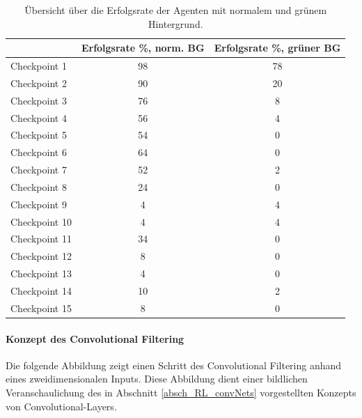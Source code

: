 \begin{center}
 \begin{table}[htb!]
 \begin{center}
  \begin{tabular}{ l c c  }
    \hline
	       				& Erfolgsrate \%, norm. BG 	& Erfolgsrate \%, grüner BG \\ \hline \hline
     Checkpoint 1  		&  98      			& 78		 \\ \hline
     Checkpoint 2  		& 90       			& 20		 \\ \hline
     Checkpoint 3  		& 76       			& 8		 \\ \hline
     Checkpoint 4  		& 56       			& 4		 \\ \hline
     Checkpoint 5  		& 54       			& 0		 \\ \hline
     Checkpoint 6 	 	& 64       			& 0		 \\ \hline
     Checkpoint 7  		& 52       			& 2		 \\ \hline
     Checkpoint 8	  	& 24       			& 0		 \\ \hline
     Checkpoint 9  		& 4       			& 4		 \\ \hline
     Checkpoint 10  		& 4       			& 4		 \\ \hline
     Checkpoint 11		& 34       			& 0		 \\ \hline
     Checkpoint 12		& 8       			& 0		 \\ \hline
     Checkpoint 13		& 4       			& 0		 \\ \hline
     Checkpoint 14  		& 10       			& 2		 \\ \hline
     Checkpoint 15  		& 8       			& 0		 \\ \hline
    \hline
  \end{tabular}
  \caption{Übersicht über die Erfolgsrate der Agenten mit normalem und grünem Hintergrund.}
  \label{tab:tab_durch_EXP_trainSetting5}
  \end{center}
 \end{table}
\end{center} 

\paragraph{Konzept des Convolutional Filtering}\label{anh_convConcept}
Die folgende Abbildung zeigt einen Schritt des Convolutional Filtering anhand eines zweidimensionalen Inputs. 
Diese Abbildung dient einer bildlichen Veranschaulichung des in Abschnitt \ref{absch_RL_convNets} vorgestellten Konzepts von Convolutional-Layers.

